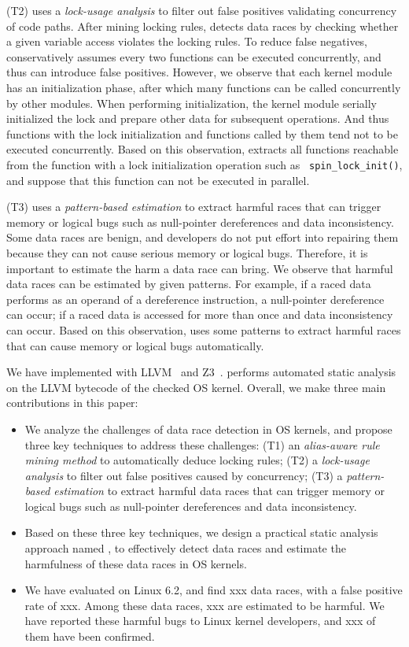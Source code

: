 (T2) \sys uses a {\em lock-usage analysis} to filter out false positives 
validating concurrency of code paths. After mining locking rules, \sys detects 
data races by checking whether a given variable access violates the 
locking rules. To reduce false negatives, \sys conservatively assumes 
every two functions can be executed concurrently, and thus can introduce false 
positives. However, we observe that each kernel module has an initialization 
phase, after which many functions can be called concurrently by other modules. 
When performing initialization, the kernel module serially initialized the lock 
and prepare other data for subsequent operations. And thus functions with the 
lock initialization and functions called by them tend not to be executed 
concurrently. Based on this observation, \sys extracts all functions 
reachable from the function with a lock initialization operation such as {\tt 
spin\_lock\_init()}, and suppose that this function can not be executed in 
parallel.

(T3) \sys uses a {\em pattern-based estimation} to extract harmful races 
that can trigger memory or logical bugs such as null-pointer dereferences and 
data inconsistency. Some data races are benign, and developers do not put 
effort into repairing them because they can not cause serious memory or logical 
bugs. Therefore, it is important to estimate the harm a data race can bring. We 
observe that harmful data races can be estimated by given patterns. For 
example, if a raced data performs as an operand of a dereference instruction, a 
null-pointer dereference can occur; if a raced data is accessed for more than 
once and data inconsistency can occur. Based on this observation, \sys 
uses some patterns to extract harmful races that can cause memory or logical 
bugs automatically.

We have implemented \sys with LLVM~\cite{clang} and Z3~\cite{z3}. 
\sys performs automated static analysis on the LLVM bytecode of the 
checked OS kernel. Overall, we make three main contributions in this paper:

\begin{itemize}
	\item We analyze the challenges of data race detection in OS kernels, and 
	propose three key techniques to address	these challenges: (T1) an {\em 
	alias-aware rule mining method} to automatically deduce locking rules; (T2) 
	a {\em lock-usage analysis} to filter out false positives caused by 
	concurrency; (T3) a {\em pattern-based estimation} to extract harmful data 
	races that can trigger memory or logical bugs such as null-pointer 
	dereferences and data inconsistency.
	\item Based on these three key techniques, we design a practical static 
	analysis approach named \sys, to effectively detect data races and 
	estimate the harmfulness of these data races in OS kernels.
	\item We have evaluated \sys on Linux 6.2, and find xxx data races, 	
	with a false positive rate of xxx. Among these data races, xxx are 
	estimated to be harmful. We have reported these harmful bugs to Linux 
	kernel developers, and xxx of them have been confirmed.
\end{itemize}

